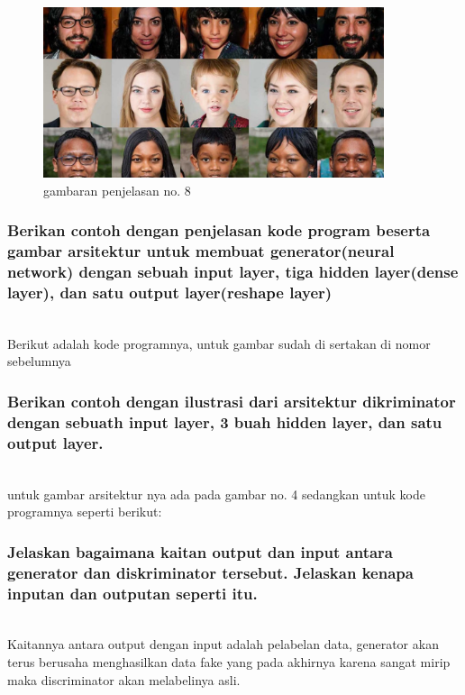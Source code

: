 \begin{figure}[H]
	\centering
	\includegraphics[width=10cm]{figures/1174070/8/implementasigan.jpg}
	\caption{gambaran penjelasan no. 8}
\end{figure}

\subsubsection{Berikan contoh dengan penjelasan kode program beserta gambar arsitektur untuk membuat generator(neural network) dengan sebuah input layer, tiga hidden layer(dense layer), dan satu output layer(reshape layer)}
\hfill\\
Berikut adalah kode programnya, untuk gambar sudah di sertakan di nomor sebelumnya


\subsubsection{Berikan contoh dengan ilustrasi dari arsitektur dikriminator dengan sebuath input layer, 3 buah hidden layer, dan satu output layer.}
\hfill\\
untuk gambar arsitektur nya ada pada gambar no. 4 sedangkan untuk kode programnya seperti berikut:



\subsubsection{Jelaskan bagaimana kaitan output dan input antara generator dan diskriminator tersebut. Jelaskan kenapa inputan dan outputan seperti itu.}
\hfill\\
Kaitannya antara output dengan input adalah pelabelan data, generator akan terus berusaha menghasilkan data fake yang pada akhirnya karena sangat mirip maka discriminator akan melabelinya asli.

